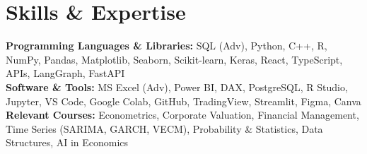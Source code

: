\documentclass[10pt, a4paper]{article}
\begin{document}
\vspace{-2pt}

\section{Skills \& Expertise}

\noindent
\textbf{Programming Languages \& Libraries:} SQL (Adv), Python, C++, R, NumPy, Pandas, Matplotlib, Seaborn, Scikit-learn, Keras, React, TypeScript, APIs, LangGraph, FastAPI \\[2pt]
\textbf{Software \& Tools:} MS Excel (Adv), Power BI, DAX, PostgreSQL, R Studio, Jupyter, VS Code, Google Colab, GitHub, TradingView, Streamlit, Figma, Canva \\[2pt]
\textbf{Relevant Courses:} Econometrics, Corporate Valuation, Financial Management, Time Series (SARIMA, GARCH, VECM), Probability \& Statistics, Data Structures, AI in Economics
\end{document}

